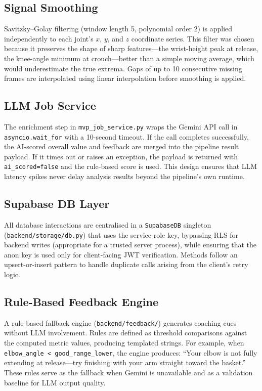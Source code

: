 \subsection{Signal Smoothing}

Savitzky--Golay filtering (window length 5, polynomial order 2) is applied independently to each joint's $x$, $y$, and $z$ coordinate series. This filter was chosen because it preserves the shape of sharp features---the wrist-height peak at release, the knee-angle minimum at crouch---better than a simple moving average, which would underestimate the true extrema. Gaps of up to 10 consecutive missing frames are interpolated using linear interpolation before smoothing is applied.

\subsection{LLM Job Service}

The enrichment step in \lstinline|mvp_job_service.py| wraps the Gemini API call in \lstinline|asyncio.wait_for| with a 10-second timeout. If the call completes successfully, the AI-scored overall value and feedback are merged into the pipeline result payload. If it times out or raises an exception, the payload is returned with \lstinline|ai_scored=false| and the rule-based score is used. This design ensures that LLM latency spikes never delay analysis results beyond the pipeline's own runtime.

\subsection{Supabase DB Layer}

All database interactions are centralised in a \lstinline|SupabaseDB| singleton (\lstinline|backend/storage/db.py|) that uses the service-role key, bypassing RLS for backend writes (appropriate for a trusted server process), while ensuring that the anon key is used only for client-facing JWT verification. Methods follow an upsert-or-insert pattern to handle duplicate calls arising from the client's retry logic.

\subsection{Rule-Based Feedback Engine}

A rule-based fallback engine (\lstinline|backend/feedback/|) generates coaching cues without LLM involvement. Rules are defined as threshold comparisons against the computed metric values, producing templated strings. For example, when \lstinline|elbow_angle < good_range_lower|, the engine produces: ``Your elbow is not fully extending at release---try finishing with your arm straight toward the basket.'' These rules serve as the fallback when Gemini is unavailable and as a validation baseline for LLM output quality.

